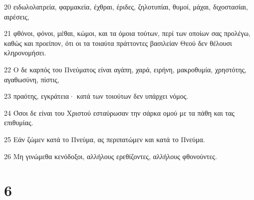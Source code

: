 \par 20 ειδωλολατρεία, φαρμακεία, έχθραι, έριδες, ζηλοτυπίαι, θυμοί, μάχαι, διχοστασίαι, αιρέσεις,
\par 21 φθόνοι, φόνοι, μέθαι, κώμοι, και τα όμοια τούτων, περί των οποίων σας προλέγω, καθώς και προείπον, ότι οι τα τοιαύτα πράττοντες βασιλείαν Θεού δεν θέλουσι κληρονομήσει.
\par 22 Ο δε καρπός του Πνεύματος είναι αγάπη, χαρά, ειρήνη, μακροθυμία, χρηστότης, αγαθωσύνη, πίστις,
\par 23 πραότης, εγκράτεια· κατά των τοιούτων δεν υπάρχει νόμος.
\par 24 Όσοι δε είναι του Χριστού εσταύρωσαν την σάρκα ομού με τα πάθη και τας επιθυμίας.
\par 25 Εάν ζώμεν κατά το Πνεύμα, ας περιπατώμεν και κατά το Πνεύμα.
\par 26 Μη γινώμεθα κενόδοξοι, αλλήλους ερεθίζοντες, αλλήλους φθονούντες.

\chapter{6}

